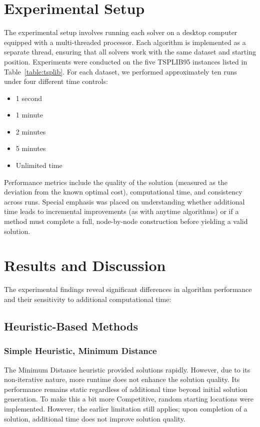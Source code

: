 \documentclass[11pt]{article}
\begin{document}
	\section{Experimental Setup}
	The experimental setup involves running each solver on a desktop computer equipped with a multi-threaded processor. Each algorithm is implemented as a separate thread, ensuring that all solvers work with the same dataset and starting position. Experiments were conducted on the five TSPLIB95 instances listed in Table~\ref{table:tsplib}. For each dataset, we performed approximately ten runs under four different time controls:
	\begin{itemize}[noitemsep]
		\item 1 second
		\item 1 minute
		\item 2 minutes
		\item 5 minutes
		\item Unlimited time
	\end{itemize}
	Performance metrics include the quality of the solution (measured as the deviation from the known optimal cost), computational time, and consistency across runs. Special emphasis was placed on understanding whether additional time leads to incremental improvements (as with anytime algorithms) or if a method must complete a full, node-by-node construction before yielding a valid solution.
	
	\section{Results and Discussion}
	The experimental findings reveal significant differences in algorithm performance and their sensitivity to additional computational time:
	
	\subsection{Heuristic-Based Methods}
	\subsubsection{Simple Heuristic, Minimum Distance}
	The Minimum Distance heuristic provided solutions rapidly. However, due to its non-iterative nature, more runtime does not enhance the solution quality. Its performance remains static regardless of additional time beyond initial solution generation. To make this a bit more Competitive, random starting locations were implemented. However, the earlier limitation still applies; upon completion of a solution, additional time does not improve solution quality.
	
\end{document}
